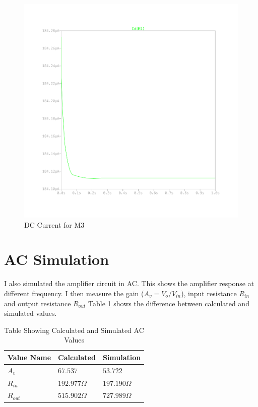 \documentclass{article}
\begin{document}
\begin{figure}[H]
    \centering
    \includegraphics[height=0.4\textheight,trim={30mm 30mm 30mm 30mm}]{img/Amplifier Design M3 I.pdf}
    \caption{DC Current for M3}
    \label{fig:dc-i-m3}
\end{figure}

\section{AC Simulation}

I also simulated the amplifier circuit in AC.
This shows the amplifier response at different frequency.
I then measure the gain ($A_{v} = V_{o} / V_{in}$), input resistance $R_{in}$ and output resistance $R_{out}$
Table \ref{tab:sim-cal-ac-values} shows the difference between calculated and simulated values.

\begin{table}[h]
    \caption{Table Showing Calculated and Simulated AC Values}
    \label{tab:sim-cal-ac-values}
    \centering
    \begin{tabular}{ l l l}
        \hline
        Value Name & Calculated       & Simulation       \\
        \hline
        $A_{v}$    & $67.537$         & $53.722$         \\
        $R_{in}$   & $192.977 \Omega$ & $197.190 \Omega$ \\
        $R_{out}$  & $515.902 \Omega$ & $727.989 \Omega$ \\
        \hline
    \end{tabular}
\end{table}
\end{document}
